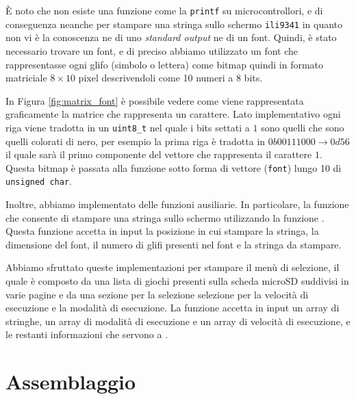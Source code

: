 \documentclass[a4paper]{article}
\begin{document}
È noto che non esiste una funzione come la \texttt{printf} su microcontrollori, e di conseguenza
neanche per stampare una stringa sullo schermo \texttt{ili9341} in quanto non vi è la conoscenza
ne di uno \textit{standard output} ne di un font. Quindi, è stato necessario trovare un font,
e di preciso abbiamo utilizzato un font che rappresentasse ogni glifo (simbolo o lettera) come
bitmap quindi in formato matriciale $8 \times 10$ pixel descrivendoli come 10 numeri a 8 bits.

In Figura \ref{fig:matrix_font} è possibile vedere come viene rappresentata graficamente
la matrice che rappresenta un carattere. Lato implementativo ogni riga viene tradotta in
un \texttt{uint8\_t} nel quale i bits settati a $1$ sono quelli che sono quelli colorati di nero,
per esempio la prima riga è tradotta in $0b00111000 \rightarrow 0d56$ il quale sarà il primo
componente del vettore che rappresenta il carattere $1$. Questa bitmap è passata alla
funzione
{}
sotto forma di vettore (\texttt{font}) lungo 10 di \texttt{unsigned char}.

Inoltre, abbiamo implementato delle funzioni ausiliarie. In particolare, la funzione
{}
che consente di stampare una stringa sullo schermo utilizzando la funzione
{}. Questa funzione accetta in input
la posizione in cui stampare la stringa, la dimensione del font, il numero di glifi presenti
nel font e la stringa da stampare.

Abbiamo sfruttato queste implementazioni per stampare il menù di selezione, il quale
è composto da una lista di giochi presenti sulla scheda microSD suddivisi in varie pagine
e da una sezione per la selezione selezione per la velocità di esecuzione e la modalità
di esecuzione. La funzione accetta in input un array di stringhe, un array di modalità di
esecuzione e un array di velocità di esecuzione, e le restanti informazioni che servono
a {}.

\clearpage

\section{Assemblaggio}
\end{document}
